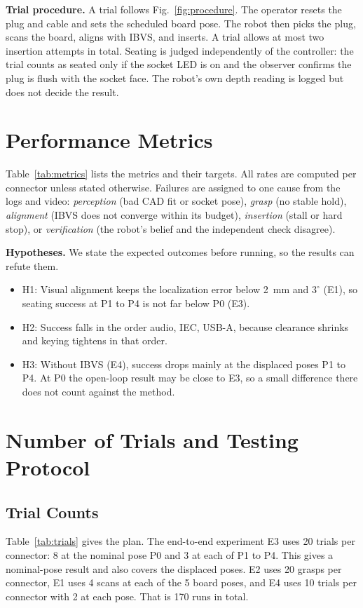 \documentclass[11pt,conference]{IEEEtran}
\begin{document}
\textbf{Trial procedure.} A trial follows Fig.~\ref{fig:procedure}. The operator resets the plug and cable and sets the scheduled board pose. The robot then picks the plug, scans the board, aligns with IBVS, and inserts. A trial allows at most two insertion attempts in total. Seating is judged independently of the controller: the trial counts as seated only if the socket LED is on and the observer confirms the plug is flush with the socket face. The robot's own depth reading is logged but does not decide the result.

\section{Performance Metrics}

Table~\ref{tab:metrics} lists the metrics and their targets. All rates are computed per connector unless stated otherwise. Failures are assigned to one cause from the logs and video: \emph{perception} (bad CAD fit or socket pose), \emph{grasp} (no stable hold), \emph{alignment} (IBVS does not converge within its budget), \emph{insertion} (stall or hard stop), or \emph{verification} (the robot's belief and the independent check disagree).

\textbf{Hypotheses.} We state the expected outcomes before running, so the results can refute them.
\begin{itemize}
\item H1: Visual alignment keeps the localization error below 2~mm and $3^\circ$ (E1), so seating success at P1 to P4 is not far below P0 (E3).
\item H2: Success falls in the order audio, IEC, USB-A, because clearance shrinks and keying tightens in that order.
\item H3: Without IBVS (E4), success drops mainly at the displaced poses P1 to P4. At P0 the open-loop result may be close to E3, so a small difference there does not count against the method.
\end{itemize}


\section{Number of Trials and Testing Protocol}

\subsection{Trial Counts}

Table~\ref{tab:trials} gives the plan. The end-to-end experiment E3 uses 20 trials per connector: 8 at the nominal pose P0 and 3 at each of P1 to P4. This gives a nominal-pose result and also covers the displaced poses. E2 uses 20 grasps per connector, E1 uses 4 scans at each of the 5 board poses, and E4 uses 10 trials per connector with 2 at each pose. That is 170 runs in total.
\end{document}
